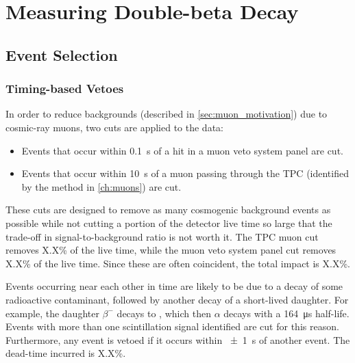 \documentclass[herrin-thesis.tex]{subfiles}
\begin{document}
\chapter{Measuring Double-beta Decay}
\label{ch:analysis}

\section{Event Selection}
\subsection{Timing-based Vetoes}
In order to reduce backgrounds (described in \cref{sec:muon_motivation}) due to cosmic-ray muons, two cuts are applied to the data:
\begin{itemize}
\item Events that occur within \SI{0.1}{\s} of a hit in a muon veto system panel are cut.
\item Events that occur within \SI{10}{\s} of a muon passing through the TPC (identified by the method in \cref{ch:muons}) are cut.
\end{itemize}
These cuts are designed to remove as many cosmogenic background events as possible while not cutting a portion of the detector live time so large that the trade-off in signal-to-background ratio is not worth it. The TPC muon cut removes X.X\% of the live time, while the muon veto system panel cut removes X.X\% of the live time. Since these are often coincident, the total impact is X.X\%.

Events occurring near each other in time are likely to be due to a decay of some radioactive contaminant, followed by another decay of a short-lived daughter. For example, the  daughter  \(\beta^{-}\) decays to , which then \(\alpha\) decays with a \SI{164}{\micro\s} half-life.  Events with more than one scintillation signal identified are cut for this reason. Furthermore, any event is vetoed if it occurs within \SI{\pm1}{\s} of another event. The dead-time incurred is X.X\%.
\end{document}
